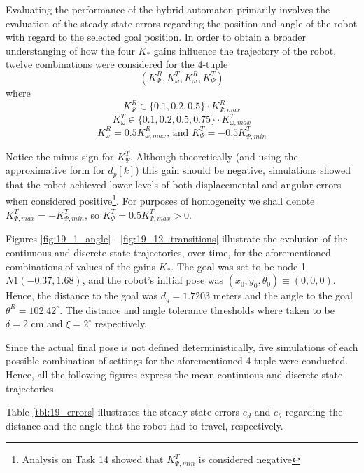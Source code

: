 Evaluating the performance of the hybrid automaton primarily involves the
evaluation of the steady-state errors regarding the position and angle of the
robot with regard to the selected goal position. In order to obtain a broader
understanging of how the four $K_{*}$ gains influence the trajectory of the
robot, twelve combinations were considered for the 4-tuple
$$(K_{\Psi}^R, K_{\omega}^T, K_{\omega}^R, K_{\Psi}^T)$$
where
$$K_{\Psi}^R \in \{0.1,0.2,0.5\} \cdot K_{\Psi,max}^R$$
$$K_{\omega}^T \in \{0.1,0.2,0.5,0.75\} \cdot K_{\omega,max}^T$$
$$K_{\omega}^R = 0.5 K_{\omega,max}^R \text{, and } K_{\Psi}^T = -0.5 K_{\Psi,min}^T$$

Notice the minus sign for $K_{\Psi}^T$. Although theoretically (and using the
approximative form for $d_p[k]$) this gain should be negative, simulations
showed that the robot achieved lower levels of both displacemental and angular
errors when considered positive\footnote{Analysis on Task 14 showed that
$K_{\Psi,min}^T$ is considered negative}. For purposes of homogeneity we shall
denote $K_{\Psi,max}^T = -K_{\Psi,min}^T$, so $K_{\Psi}^T = 0.5 K_{\Psi,max}^T > 0$.

Figures \ref{fig:19_1_angle} - \ref{fig:19_12_transitions} illustrate the
evolution of the continuous and discrete state trajectories, over time, for the
aforementioned combinations of values of the gains $K_{*}$. The goal was set to
be node 1 $N1(-0.37, 1.68)$, and the robot's initial pose was
$(x_0, y_0, \theta_0) \equiv (0,0,0)$. Hence, the distance to the goal was
$d_g = 1.7203$ meters and the angle to the goal $\theta^R = 102.42^{\circ}$. The
distance and angle tolerance thresholds where taken to be $\delta = 2\text{ cm}$
and $\xi = 2^{\circ}$ respectively.

Since the actual final pose is not defined deterministically, five simulations
of each possible combination of settings for the aforementioned 4-tuple were
conducted. Hence, all the following figures express the mean continuous and
discrete state trajectories.

Table \ref{tbl:19_errors} illustrates the steady-state errors $e_d$ and
$e_{\theta}$ regarding the distance and the angle that the robot had to travel,
respectively.


